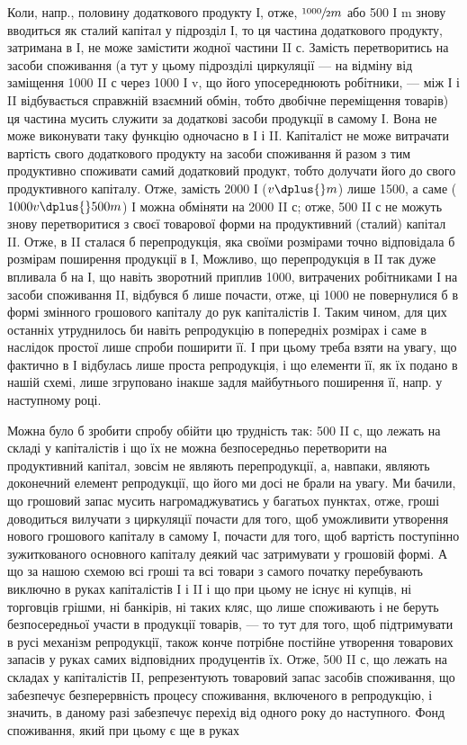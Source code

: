 
Коли, напр., половину додаткового продукту І, отже, $\sfrac{1000}{2} m$ або
500 І m знову вводиться як сталий капітал у підрозділ І, то ця частина
додаткового продукту, затримана в І, не може замістити жодної частини
II с. Замість перетворитись на засоби споживання (а тут у цьому підрозділі
циркуляції — на відміну від заміщення 1000 II с через 1000 І v,
що його упосереднюють робітники, — між І і II відбувається справжній
взаємний обмін, тобто двобічне переміщення товарів) ця частина мусить
служити за додаткові засоби продукції в самому І. Вона не може виконувати
таку функцію одночасно в І і II. Капіталіст не може витрачати
вартість свого додаткового продукту на засоби споживання й разом
з тим продуктивно споживати самий додатковий продукт, тобто долучати
його до свого продуктивного капіталу. Отже, замість 2000 І ($v \dplus{} m$)
лише 1500, а саме ($1000 v \dplus{} 500 m$) І можна обміняти на 2000 II с;
отже, 500 II с не можуть знову перетворитися з своєї товарової форми
на продуктивний (сталий) капітал II. Отже, в II сталася б перепродукція,
яка своїми розмірами точно відповідала б розмірам поширення продукції
в І, Можливо, що перепродукція в II так дуже впливала б на І,
що навіть зворотний приплив 1000, витрачених робітниками І на засоби
споживання II, відбувся б лише почасти, отже, ці 1000 не повернулися б
в формі змінного грошового капіталу до рук капіталістів І. Таким чином,
для цих останніх утруднилось би навіть репродукцію в попередніх
розмірах і саме в наслідок простої лише спроби поширити її. І при цьому
треба взяти на увагу, що фактично в І відбулась лише проста репродукція,
і що елементи її, як їх подано в нашій схемі, лише згруповано інакше
задля майбутнього поширення її, напр. у наступному році.

Можна було б зробити спробу обійти цю трудність так: 500 II с,
що лежать на складі у капіталістів і що їх не можна безпосередньо
перетворити на продуктивний капітал, зовсім не являють перепродукції,
а, навпаки, являють доконечний елемент репродукції, що його ми досі
не брали на увагу. Ми бачили, що грошовий запас мусить нагромаджуватись
у багатьох пунктах, отже, гроші доводиться вилучати з циркуляції
почасти для того, щоб уможливити утворення нового грошового
капіталу в самому І, почасти для того, щоб вартість поступінно
зужиткованого основного капіталу деякий час затримувати у грошовій
формі. А що за нашою схемою всі гроші та всі товари з самого
початку перебувають виключно в руках капіталістів І і II і що
при цьому не існує ні купців, ні торговців грішми, ні банкірів, ні таких
кляс, що лише споживають і не беруть безпосередньої участи в продукції
товарів, — то тут для того, щоб підтримувати в русі механізм репродукції,
також конче потрібне постійне утворення товарових запасів
у руках самих відповідних продуцентів їх. Отже, 500 II с, що лежать
на складах у капіталістів II, репрезентують товаровий запас засобів споживання,
що забезпечує безперервність процесу споживання, включеного
в репродукцію, і значить, в даному разі забезпечує перехід від одного
року до наступного. Фонд споживання, який при цьому є ще в руках
\parbreak{}  %
